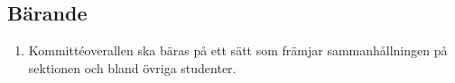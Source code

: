 \documentclass[11pt,a4paper]{article}
\begin{document}
\subsection{Bärande}

\begin{enumerate}[\thesubsection .1]

  \item Kommittéoverallen ska bäras på ett sätt som främjar
  samman\-håll\-ning\-en på sektionen och bland övriga studenter.

\end{enumerate}
\begin{comment}
\newpage

\appendix

\section{Förteckning över Dumvästinnehavare}

\label{dumvast}

Här följer samtliga dumvästinnehavare sedan denna förnämliga post
infördes. Att ingen ny och bättre dumhet hittats på nästa sektionsmöte
indikeras genom att antalet sektionsmöten återfinns inom parantes. Den
färskaste innehavaren återfinns överst.

\begin{longtable}{p{55mm}lp{60mm}}
  \emph{Namn} & \emph{Årskurs} & \emph{Dumhet}\\ \hline

Oskar ''Gurkan'' Sjökvist & f14 & Skrev ut ett labb-PM till expfysen i A0-format. 3 gånger. 

Johanna ''Nioreh'' Renman & f14& Hade sönder Tvåan och hamnade på Hvitfeldska med 11 flak öl under en föräldrakväll. \\\hline

Felix ''Felkan'' Eriksson & f13 & Trodde att pasta växer på träd. \\\hline

Per Ljung & f13 & Klagade över att han inte kunde få tag i någon studentlägenhet närmre Chalmers. Det uppdagades sedan att han på Boplats var registrerad som att han gick i grundskolan. När han väl fick en lägenhet sade han upp sin gamla innnan visningen, varpå han nästan missade att tacka ja till den nya.  \\\hline

Sofia ''Sol'' Toivonen & tm12 & Försökte förgäves rensa vasken på Focus med händerna, utan att inse att problemet var att proppen satt i. \\\hline


\end{comment}
\end{document}
